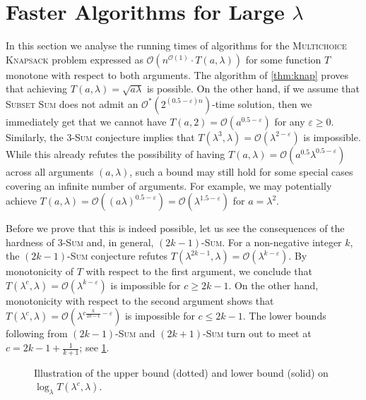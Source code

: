 \documentclass{article}
\theoremstyle{plain}
\theoremstyle{definition}
\newcommand{\MK}{\textsc{Multichoice Knapsack}\xspace}
\newcommand{\SubsetSum}{\textsc{Subset Sum}\xspace}
\newcommand{\Sum}{\textsc{Sum}\xspace}
\newcommand{\Oh}{\mathcal{O}}
\begin{document}
 


    
    \section{Faster Algorithms for Large $\lambda$}\label{app:fast}
    In this section we analyse the running times of algorithms for the \MK problem expressed
    as $\Oh(n^{\Oh(1)}\cdot T(a,\lambda))$  for some function $T$ monotone with respect to both arguments.
    The algorithm of \cref{thm:knap} proves that achieving $T(a,\lambda)=\sqrt{a\lambda}$ is possible. 
    On the other hand, if we assume that \SubsetSum does not admit an $\Oh^*(2^{(0.5-\varepsilon)n})$-time solution,
    then we immediately get that we cannot have $T(a,2)=\Oh(a^{0.5 -\varepsilon})$ for any $\varepsilon \ge 0$.
    Similarly, the 3-\Sum conjecture implies that $T(\lambda^3,\lambda)=\Oh(\lambda^{2-\varepsilon})$ is impossible.
    While this already refutes the possibility of having $T(a,\lambda)=\Oh(a^{0.5}\lambda^{0.5-\varepsilon})$
    across all arguments $(a,\lambda)$, such a bound may still hold for some special cases covering an infinite number of arguments.
    For example, we may potentially achieve $T(a,\lambda)=\Oh((a\lambda)^{0.5-\varepsilon})=\Oh(\lambda^{1.5-\varepsilon})$ for $a=\lambda^2$.
    
    Before we prove that this is indeed possible, let us see the consequences of the hardness of 3-\Sum and, in general, $(2k-1)$-\Sum.   
    For a non-negative integer $k$, the $(2k-1)$-\Sum conjecture refutes $T(\lambda^{2k-1},\lambda)=\Oh(\lambda^{k-\varepsilon})$.
    By monotonicity of $T$ with respect to the first argument, we conclude that $T(\lambda^{c},\lambda)=\Oh(\lambda^{k-\varepsilon})$
    is impossible for $c\ge 2k-1$. 
    On the other hand, monotonicity with respect to the second argument shows that
    $T(\lambda^{c},\lambda)=\Oh(\lambda^{c\frac{k}{2k-1}-\varepsilon})$
    is impossible for $c\le 2k-1$. The lower bounds following from $(2k-1)$-\Sum and $(2k+1)$-\Sum
    turn out to meet at $c=2k-1+\frac{1}{k+1}$; see \cref{fig:graph}.
    
    
       \begin{figure}[hb]
   \begin{center}
\end{center}
\caption{Illustration of the upper bound (dotted) and lower bound (solid) on $\log_{\lambda}T(\lambda^c,\lambda)$.}\label{fig:graph}
\end{figure}
\end{document}

